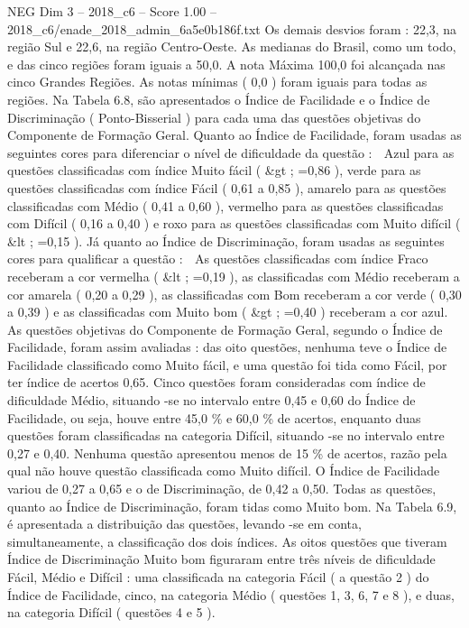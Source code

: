 \begin{textsample}{NEG Dim 3 – 2018\_c6 – Score 1.00 – 2018\_c6/enade\_2018\_admin\_6a5e0b186f.txt}
Os demais desvios foram : 22,3, na região Sul e 22,6, na região Centro-Oeste.
As medianas do Brasil, como um todo, e das cinco regiões foram iguais a 50,0.
A nota Máxima 100,0 foi alcançada nas cinco Grandes Regiões.
As notas mínimas ( 0,0 ) foram iguais para todas as regiões.
Na Tabela 6.8, são apresentados o Índice de Facilidade e o Índice de Discriminação ( Ponto-Bisserial ) para cada uma das questões objetivas do Componente de Formação Geral.
Quanto ao Índice de Facilidade, foram usadas as seguintes cores para diferenciar o nível de dificuldade da questão :  Azul para as questões classificadas com índice Muito fácil ( \&gt ; =0,86 ), verde para as questões classificadas com índice Fácil ( 0,61 a 0,85 ), amarelo para as questões classificadas com Médio ( 0,41 a 0,60 ), vermelho para as questões classificadas com Difícil ( 0,16 a 0,40 ) e roxo para as questões classificadas com Muito difícil ( \&lt ; =0,15 ).
Já quanto ao Índice de Discriminação, foram usadas as seguintes cores para qualificar a questão :  As questões classificadas com índice Fraco receberam a cor vermelha ( \&lt ; =0,19 ), as classificadas com Médio receberam a cor amarela ( 0,20 a 0,29 ), as classificadas com Bom receberam a cor verde ( 0,30 a 0,39 ) e as classificadas com Muito bom ( \&gt ; =0,40 ) receberam a cor azul.
As questões objetivas do Componente de Formação Geral, segundo o Índice de Facilidade, foram assim avaliadas : das oito questões, nenhuma teve o Índice de Facilidade classificado como Muito fácil, e uma questão foi tida como Fácil, por ter índice de acertos 0,65.
Cinco questões foram consideradas com índice de dificuldade Médio, situando -se no intervalo entre 0,45 e 0,60 do Índice de Facilidade, ou seja, houve entre 45,0 \% e 60,0 \% de acertos, enquanto duas questões foram classificadas na categoria Difícil, situando -se no intervalo entre 0,27 e 0,40.
Nenhuma questão apresentou menos de 15 \% de acertos, razão pela qual não houve questão classificada como Muito difícil.
O Índice de Facilidade variou de 0,27 a 0,65 e o de Discriminação, de 0,42 a 0,50.
Todas as questões, quanto ao Índice de Discriminação, foram tidas como Muito bom.
Na Tabela 6.9, é apresentada a distribuição das questões, levando -se em conta, simultaneamente, a classificação dos dois índices.
As oitos questões que tiveram Índice de Discriminação Muito bom figuraram entre três níveis de dificuldade Fácil, Médio e Difícil : uma classificada na categoria Fácil ( a questão 2 ) do Índice de Facilidade, cinco, na categoria Médio ( questões 1, 3, 6, 7 e 8 ), e duas, na categoria Difícil ( questões 4 e 5 ).

\end{textsample}

